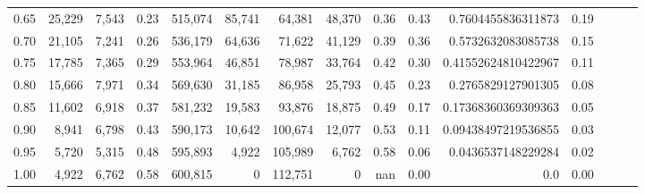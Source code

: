 \begin{tabular}{rrrrrrrrrrrrrrr}
0.65 &  25,229 &  7,543 &  0.23 &  515,074 &   85,741 &   64,381 &   48,370 &  0.36 &  0.43 &   0.7604455836311873 &      0.19 \\
0.70 &  21,105 &  7,241 &  0.26 &  536,179 &   64,636 &   71,622 &   41,129 &  0.39 &  0.36 &   0.5732632083085738 &      0.15 \\
0.75 &  17,785 &  7,365 &  0.29 &  553,964 &   46,851 &   78,987 &   33,764 &  0.42 &  0.30 &  0.41552624810422967 &      0.11 \\
0.80 &  15,666 &  7,971 &  0.34 &  569,630 &   31,185 &   86,958 &   25,793 &  0.45 &  0.23 &   0.2765829127901305 &      0.08 \\
0.85 &  11,602 &  6,918 &  0.37 &  581,232 &   19,583 &   93,876 &   18,875 &  0.49 &  0.17 &  0.17368360369309363 &      0.05 \\
0.90 &   8,941 &  6,798 &  0.43 &  590,173 &   10,642 &  100,674 &   12,077 &  0.53 &  0.11 &  0.09438497219536855 &      0.03 \\
0.95 &   5,720 &  5,315 &  0.48 &  595,893 &    4,922 &  105,989 &    6,762 &  0.58 &  0.06 &   0.0436537148229284 &      0.02 \\
1.00 &   4,922 &  6,762 &  0.58 &  600,815 &        0 &  112,751 &        0 &   nan &  0.00 &                  0.0 &      0.00 \\
\bottomrule
\end{tabular}
